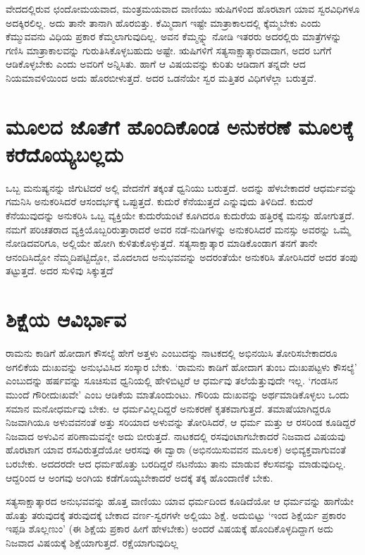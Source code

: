 ವೇದದಲ್ಲಿರುವ ಛಂದೋಮಯವಾದ, ಮಂತ್ರಮಯವಾದ ವಾಣಿಯು ಋಷಿಗಳಿಂದ ಹೊರಟಾಗ ಯಾವ ಸ್ವರವಿಧಿಗಳೂ ಅದಕ್ಕಿರಲಿಲ್ಲ. ಅದು ತಾನೇ ತಾನಾಗಿ ಹೊರಬಿತ್ತು. ಕೆಮ್ಮಿದಾಗ ಇಷ್ಟೇ ಮಾತ್ರಾಕಾಲದಲ್ಲಿ  ಕ್ಕೆಮ್ಮಬೇಕು ಎಂದು ಕೆಮ್ಮುವವನು ವಿಧಿಯ ಪ್ರಕಾರ ಕೆಮ್ಮಲಾಗುವುದಿಲ್ಲ. ಅವನ ಕೆಮ್ಮನ್ನ್ನು ನೋಡಿ ಇತರರು ಅದರಲ್ಲಿರು ಮಾತ್ರೆಗಳನ್ನು  ಗಣಿಸಿ ಮಾತ್ರಾಕಾಲವನ್ನು  ಗುರುತಿಸಿಕೊಳ್ಳಬಹುದು ಅಷ್ಟೇ. ಋಷಿಗಳಿಗೆ ಸತ್ಯಸಾಕ್ಷಾತ್ಕಾರವಾದಾಗ, ಅದರ ಬಗೆಗೆ ಆಡಿಕೊಳ್ಳಬೇಕು  ಎಂದು ಅವರಿಗೆ ಅನ್ನಿಸಿತು. ಹಾಗೆ ಆ ವಿಷಯವನ್ನು ಕುರಿತು ಆಡಿದಾಗ ತನ್ನದೇ ಆದ ನಿಯಮಾವಳಿಯಿಂದ ಅದು ಹೊರಬೀಳುತ್ತದೆ. ಅದರ ಒಡನೆಯೇ ಸ್ವರ ಮತ್ತಿತರ ವಿಧಿಗಳೆಲ್ಲಾ ಬರುತ್ತವೆ.

\section*{ಮೂಲದ ಜೊತೆಗೆ ಹೊಂದಿಕೊಂಡ ಅನುಕರಣೆ ಮೂಲಕ್ಕೆ  ಕರೆದೊಯ್ಯಬಲ್ಲದು}

ಒಬ್ಬ ಮನುಷ್ಯನನ್ನು ಜಿಗುಟಿದರೆ ಅಲ್ಲಿ ವೇದನೆಗೆ ತಕ್ಕಂತೆ ಧ್ವನಿಯು ಬರುತ್ತದೆ. ಅದನ್ನು ಹೆಳಬೇಕಾದರೆ ಆಧರ್ಮವನ್ನು ಗಮನಿಸಿ ಅನುಕರಿಸಿದರೆ ಆಸಂದರ್ಭಕ್ಕೆ  ಒಪ್ಪುತ್ತದೆ. ಕುದುರೆ ಕೆನೆಯುತ್ತದೆ ಎನ್ನುವುದು ತಿಳಿದಿದೆ. ಕುದುರೆ ಕೆನೆಯುವುದನ್ನು ಅನುಕರಿಸಿ ಒಬ್ಬ ವ್ಯಕ್ತಿಯೇ ಕುದುರೆಯಂಟೆ ಕೂಗಿದರೂ ಕುದುರೆಯ ಹತ್ತಿರಕ್ಕೆ ಮನಸ್ಸು  ಹೋಗುತ್ತದೆ. ನಮಗೆ ಪರಿಚತರಾದ ವ್ಯಕ್ತಿಯೊಬ್ಬರಿರುತ್ತಾರಾದರೆ ಅವರ ನಡೆ-ನುಡಿಗಳನ್ನು ಅನುಕರಿಸಿದರೆ ಮನಸ್ಸು ಅವರನ್ನು ಒಮ್ಮೆ  ನೋಡಿದವರಿಗೂ, ಅಲ್ಲಿಯೇ ಹೋಗಿ ಕುಳಿತುಕೊಳ್ಳುತ್ತದೆ. ಸತ್ಯಸಾಕ್ಷಾತ್ಕಾರ ಮಾಡಿಕೊಂಡಾಗ ತನಗೆ ತಾನೇ ಆನಂದಿಸಿದ್ದೋ ನೆಮ್ಮದಿಪಟ್ಟಿದ್ದೋ, ಮೊದಲಾದ ಅನುಭವವನ್ನು  ಅದರಂತೆಯೇ ಅನುಕರಿಸಿ ತೋರಿಸಿದರೆ ಅದರ ತಂಪು ತಟ್ಟುತ್ತದೆ. ಅದರ ಸುಳಿವು ಸಿಕ್ಕುತ್ತದೆ

\section*{ಶಿಕ್ಷೆಯ ಆವಿರ್ಭಾವ}

ರಾಮನು ಕಾಡಿಗೆ ಹೋದಾಗ  ಕೌಸಲ್ಯೆ  ಹೇಗೆ ಅತ್ತಳು ಎಂಬುದನ್ನು ನಾಟಕದಲ್ಲಿ ಅಭಿನಯಿಸಿ ತೋರಿಸಬೇಕಾದರೂ ಅಗಲಿಕೆಯ ದುಃಖವನ್ನು ಅನುಭವಿಸಿದ ಸಂಸ್ಕಾರ ಬೇಕು. `ರಾಮನು ಕಾಡಿಗೆ ಹೋದಾಗ ತುಂಬ ದುಃಖಪಟ್ಟಳು ಕೌಸಲ್ಯೆ' ಎಂಬುದನ್ನು  ಹರ್ಷವನ್ನು ಸೂಚಿಸುವ ಧ್ವನಿಯಲ್ಲಿ ಹೇಳಿಬಿಟ್ಟರೆ  ಆ ಧರ್ಮವು ತಲೆಯೆತ್ತುವುದೇ ಇಲ್ಲ. `ಗಂಡಸಿನ ಮುಂದೆ ಗೌರೀದುಃಖವೇ' ಎಂಬ ಆಡಿಕೆಯ ಮಾತೊಂದುಂಟು. ಗೌರಿಯ ದುಃಖವನ್ನು ಅರ್ಥಮಾಡಿಕೊಳ್ಳಲು ಒಂದು ಸಮಾನ ಮನೋಧರ್ಮವು ಬೇಕು. ಆ ಧರ್ಮವಿಲ್ಲದಿದ್ದರೆ ಅನುಕರಣೆ ಕೃತಕವಾಗುತ್ತದೆ. ತಮಾಷೆಯಾಗಿದ್ದರೂ ನಿಜವಾಗಿಯೂ ಅಳುವವನಂತೆ ಅತ್ತು  ಸರಿಯಾದ ಅಳುವನ್ನು  ತೋರಿಸಿದರೆ, ಆ ಧರ್ಮ ಮತ್ತು ಆ ರಸರಿಂಡ ಕೂಡಿದ್ದರೆ ನಿಜವಾದ ಅಳುವಿನ ಪರಿಣಾಮವನ್ನೇ ಅದು ಬೀರುತ್ತದೆ. ನಾಟಕದಲ್ಲಿ ರಸವುಂಟಾಗಬೇಕಾದರೆ ನಿಜವಾದ ವಿಷಯವು ಹೊರಟಾಗ ಯಾವ ರಸವಿರುತ್ತದೆಯೋ ಆರಸವು ಈ ದ್ವಾರಾ (ಅಭಿನಯಿಸುವವನ ಮೂಲಕ) ಅಭಿವ್ಯಕ್ತವಾಗುವಂತೆ ಬರಬೇಕು. ಅದದರದೇ ಆದ ಧರ್ಮಹೊತ್ತು ಬರದಿದ್ದರೆ ನಟನೆಯು ತಾನು ಮಾಡುವ ಕೆಲಸವನ್ನು  ಮಾಡುವುದಿಲ್ಲ. ಆದ್ದರಿಂದ ಆ ಅಂಗವು ಅಂಗಿಯ ಕಡೆಗೊಯ್ಯಬೇಕಾದರೆ ಅದಕ್ಕೆ ತಕ್ಕ ಹೊಂದಾಣಿಕೆ ಬೇಕು. 

ಸತ್ಯಸಾಕ್ಷಾತ್ಕಾರದ ಅನುಭವವನ್ನು  ಹೊತ್ತ ವಾಣಿಯು ಯಾವ ಧರ್ಮದಿಂದ ಕೂಡಿದೆಯೋ ಆ ಧರ್ಮವನ್ನು ಹಾಗೆಯೇ ಹೊತ್ತು ತರುವುದಕ್ಕೆ ತರುವುದಕ್ಕೆ ಬೇಕಾದ ವರ್ಣ-ಸ್ವರಗಳೇ ಅಲ್ಲಿಯು ಶಿಕ್ಷೆ. ಅದುಬಿಟ್ಟು `ಇಂದ ಶಿಕ್ಷೆರ್ಯ ಪ್ರಕಾರಂ ಇಪ್ಪಡಿ ಶೊಲ್ಲಣುಂ' (ಈ ಶಿಕ್ಷೆಯ ಪ್ರಕಾರ ಹೀಗೆ  ಹೇಳಬೇಕು) ಅಂದರೆ ವಿಷಯಕ್ಕೆ  ಹೊಂದಿಕೊಳ್ಳದಿದ್ದಾಗ ಅದು ನಿಜವಾದ ವಿಷಯಕ್ಕೆ ಶಿಕ್ಷೆಯಾಗುತ್ತದೆ. ರಕ್ಷೆಯಾಗುವುದಿಲ್ಲ
 
